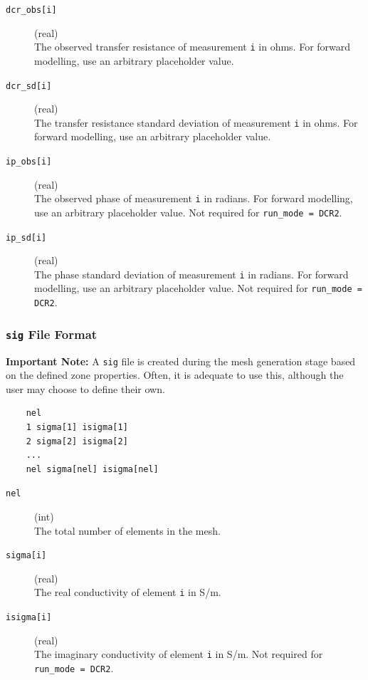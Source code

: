 \documentclass[a4paper,12pt]{article}
\begin{document}
\begin{description}
    \item[\texttt{dcr\_obs[i]}] (real)\hfill \\
    The observed transfer resistance of measurement \texttt{i} in ohms. For forward modelling, use an arbitrary placeholder value.

    \item[\texttt{dcr\_sd[i]}] (real)\hfill \\
    The transfer resistance standard deviation of measurement \texttt{i} in ohms. For forward modelling, use an arbitrary placeholder value.

    \item[\texttt{ip\_obs[i]}] (real)\hfill \\
    The observed phase of measurement \texttt{i} in radians. For forward modelling, use an arbitrary placeholder value. Not required for \texttt{run\_mode = DCR2}.

    \item[\texttt{ip\_sd[i]}] (real)\hfill \\
    The phase standard deviation of measurement \texttt{i} in radians. For forward modelling, use an arbitrary placeholder value. Not required for \texttt{run\_mode = DCR2}.
\end{description}



\subsubsection{\texttt{sig} File Format} \label{forward_sig}

\begin{framed}
\noindent \textbf{Important Note:} A \texttt{sig} file is created during the mesh generation stage based on the defined zone properties. Often, it is adequate to use this, although the user may choose to define their own.
\end{framed}

\begin{framed}
\begin{verbatim}
    nel
    1 sigma[1] isigma[1]
    2 sigma[2] isigma[2]
    ...
    nel sigma[nel] isigma[nel]
\end{verbatim}
\end{framed}

\begin{description}
    \item[\texttt{nel}] (int)\hfill \\
    The total number of elements in the mesh.
    
    \item[\texttt{sigma[i]}] (real)\hfill \\
    The real conductivity of element \texttt{i} in S/m.

    \item[\texttt{isigma[i]}] (real)\hfill \\
    The imaginary conductivity of element \texttt{i} in S/m.  Not required for \texttt{run\_mode = DCR2}.
\end{description}
\end{document}
